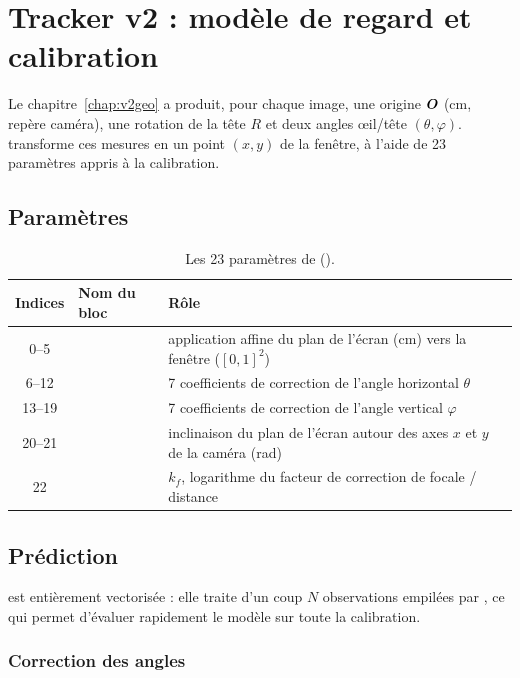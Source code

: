 \chapter{Tracker v2 : modèle de regard et calibration}
\label{chap:v2mod}

Le chapitre~\ref{chap:v2geo} a produit, pour chaque image, une origine $\bm{O}$ (cm, repère caméra), une rotation de la tête $R$ et deux angles œil/tête $(\theta, \varphi)$.  transforme ces mesures en un point $(x, y)$ de la fenêtre, à l'aide de 23 paramètres appris à la calibration.

\section{Paramètres}

\begin{table}[H]
\centering\small
\begin{tabularx}{\textwidth}{@{}c l L@{}}
\toprule
Indices & Nom du bloc & Rôle \\
--5 &  & application affine du plan de l'écran (cm) vers la fenêtre ($[0,1]^2$) \\
6--12 &  & 7 coefficients de correction de l'angle horizontal $\theta$ \\
13--19 &  & 7 coefficients de correction de l'angle vertical $\varphi$ \\
20--21 &  & inclinaison du plan de l'écran autour des axes $x$ et $y$ de la caméra (rad) \\
22 &  & $k_f$, logarithme du facteur de correction de focale / distance \\
\bottomrule
\end{tabularx}
\caption{Les 23 paramètres de  ().}
\end{table}

\section{Prédiction}

 est entièrement vectorisée : elle traite d'un coup $N$ observations empilées par , ce qui permet d'évaluer rapidement le modèle sur toute la calibration.

\subsection{Correction des angles}
\label{sec:correction-angles}

